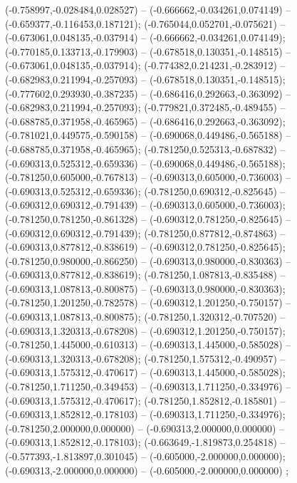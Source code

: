 (-0.758997,-0.028484,0.028527) -- (-0.666662,-0.034261,0.074149) -- (-0.659377,-0.116453,0.187121);
 (-0.765044,0.052701,-0.075621) -- (-0.673061,0.048135,-0.037914) -- (-0.666662,-0.034261,0.074149);
 (-0.770185,0.133713,-0.179903) -- (-0.678518,0.130351,-0.148515) -- (-0.673061,0.048135,-0.037914);
 (-0.774382,0.214231,-0.283912) -- (-0.682983,0.211994,-0.257093) -- (-0.678518,0.130351,-0.148515);
 (-0.777602,0.293930,-0.387235) -- (-0.686416,0.292663,-0.363092) -- (-0.682983,0.211994,-0.257093);
 (-0.779821,0.372485,-0.489455) -- (-0.688785,0.371958,-0.465965) -- (-0.686416,0.292663,-0.363092);
 (-0.781021,0.449575,-0.590158) -- (-0.690068,0.449486,-0.565188) -- (-0.688785,0.371958,-0.465965);
 (-0.781250,0.525313,-0.687832) -- (-0.690313,0.525312,-0.659336) -- (-0.690068,0.449486,-0.565188);
 (-0.781250,0.605000,-0.767813) -- (-0.690313,0.605000,-0.736003) -- (-0.690313,0.525312,-0.659336);
 (-0.781250,0.690312,-0.825645) -- (-0.690312,0.690312,-0.791439) -- (-0.690313,0.605000,-0.736003);
 (-0.781250,0.781250,-0.861328) -- (-0.690312,0.781250,-0.825645) -- (-0.690312,0.690312,-0.791439);
 (-0.781250,0.877812,-0.874863) -- (-0.690313,0.877812,-0.838619) -- (-0.690312,0.781250,-0.825645);
 (-0.781250,0.980000,-0.866250) -- (-0.690313,0.980000,-0.830363) -- (-0.690313,0.877812,-0.838619);
 (-0.781250,1.087813,-0.835488) -- (-0.690313,1.087813,-0.800875) -- (-0.690313,0.980000,-0.830363);
 (-0.781250,1.201250,-0.782578) -- (-0.690312,1.201250,-0.750157) -- (-0.690313,1.087813,-0.800875);
 (-0.781250,1.320312,-0.707520) -- (-0.690313,1.320313,-0.678208) -- (-0.690312,1.201250,-0.750157);
 (-0.781250,1.445000,-0.610313) -- (-0.690313,1.445000,-0.585028) -- (-0.690313,1.320313,-0.678208);
 (-0.781250,1.575312,-0.490957) -- (-0.690313,1.575312,-0.470617) -- (-0.690313,1.445000,-0.585028);
 (-0.781250,1.711250,-0.349453) -- (-0.690313,1.711250,-0.334976) -- (-0.690313,1.575312,-0.470617);
 (-0.781250,1.852812,-0.185801) -- (-0.690313,1.852812,-0.178103) -- (-0.690313,1.711250,-0.334976);
 (-0.781250,2.000000,0.000000) -- (-0.690313,2.000000,0.000000) -- (-0.690313,1.852812,-0.178103);
 (-0.663649,-1.819873,0.254818) -- (-0.577393,-1.813897,0.301045) -- (-0.605000,-2.000000,0.000000);
 (-0.690313,-2.000000,0.000000) -- (-0.605000,-2.000000,0.000000) ;
